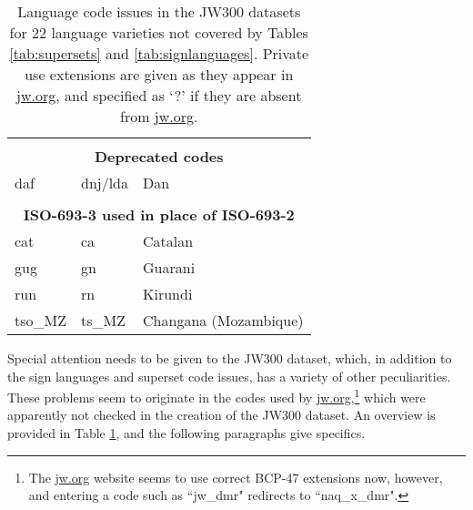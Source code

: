 \begin{table}[th!]
\begin{tabular}{lll}
            \multicolumn{3}{c}{}                                                          \\
            \multicolumn{3}{c}{\textbf{Deprecated codes}}                                 \\
            \midrule
            daf                    & dnj/lda              & Dan                           \\

            \multicolumn{3}{c}{}                                                          \\
            \multicolumn{3}{c}{\textbf{ISO-693-3 used in place of ISO-693-2}}             \\
            \midrule
            cat                    & ca                   & Catalan                       \\
            gug                    & gn                   & Guarani                       \\
            run                    & rn                   & Kirundi                       \\
            tso\_MZ                & ts\_MZ               & Changana (Mozambique)         \\
            \bottomrule
        \end{tabular}%
    \caption{Language code issues in the JW300 datasets for 22 language varieties not covered by Tables \ref{tab:supersets} and \ref{tab:signlanguages}.
        Private use extensions are given as they appear in \url{jw.org}, and specified as `?' if they are absent from \url{jw.org}.}
    \label{tab:jw300nonbcp}
\end{table}

Special attention needs to be given to the JW300 dataset, which, in addition to the sign languages and superset code issues, has a variety of other peculiarities. These problems seem to originate in the codes used by \url{jw.org},\footnote{The \url{jw.org} website seems to use correct BCP-47 extensions now, however, and entering a code such as ``jw\_dmr" redirects to ``naq\_x\_dmr".} which were apparently not checked in the creation of the JW300 dataset. An overview is provided in Table \ref{tab:jw300nonbcp}, and the following paragraphs give specifics.

